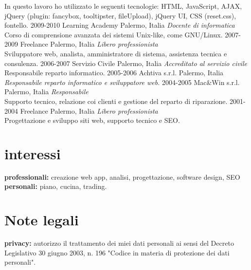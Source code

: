 \documentclass[]{friggeri-cv} %
\begin{document}
\begin{entrylist}
{In questo lavoro ho utilizzato le seguenti tecnologie: HTML,
JavaScript, AJAX, jQuery (plugin: fancybox, tooltipster, fileUpload),
jQuery UI, CSS (reset.css), fontello.
}
\entry
{2009-2010}
{Learning Academy}
{Palermo, Italia}
{\emph{Docente di informatica} \\
Corso di comprensione avanzata dei sistemi Unix-like, come GNU/Linux.
}
\entry
{2007-2009}
{Freelance}
{Palermo, Italia}
{\emph{Libero professionista} \\
Sviluppatore web, analista, amministratore di sistema, assistenza tecnica e consulenza.
}
\entry
{2006-2007}
{Servizio Civile}
{Palermo, Italia}
{\emph{Accreditato al servizio civile} \\
Responsabile reparto informatico.
}
\entry
{2005-2006}
{Achtiva s.r.l.}
{Palermo, Italia}
{\emph{Responsabile reparto informatico e sviluppatore web.} }
\entry
{2004-2005}
{Mac\&Win s.r.l.}
{Palermo, Italia}
{\emph{Responsabile} \\
Supporto tecnico, relazione coi clienti e gestione del reparto di riparazione.
}
\entry
{2001-2004}
{Freelance}
{Palermo, Italia}
{\emph{Libero professionista} \\
Progettazione e sviluppo siti web, supporto tecnico e SEO.
}
\end{entrylist}

\section{interessi}
\textbf{professionali:} creazione web app, analisi, progettazione, software design, SEO \textbf{personali:} piano, cucina, trading.

\section{Note legali}
\textbf{privacy:} autorizzo il trattamento dei miei dati personali ai sensi del Decreto
Legislativo 30 giugno 2003, n. 196  "Codice in materia di protezione dei dati
personali".
\end{document}
